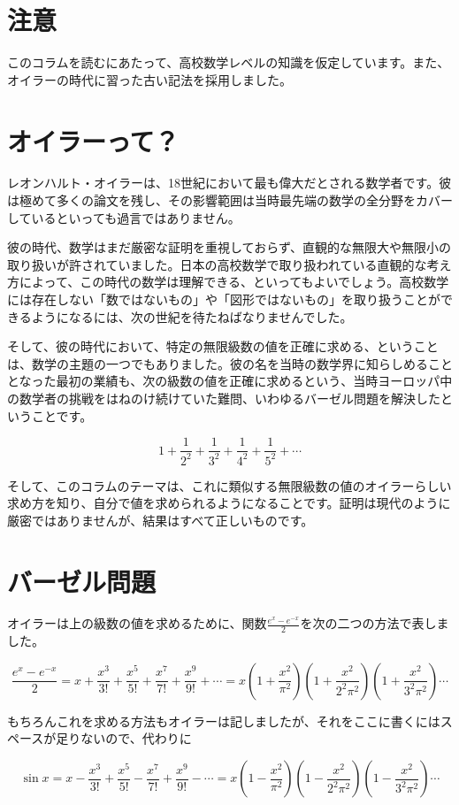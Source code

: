 \documentclass[./main]{subfiles}
\theoremstyle{break}
\begin{document}
\setcounter{section}{-1}
\section{注意}
このコラムを読むにあたって、高校数学レベルの知識を仮定しています。また、オイラーの時代に習った古い記法を採用しました。
\section{オイラーって？}
レオンハルト・オイラーは、18世紀において最も偉大だとされる数学者です。彼は極めて多くの論文を残し、その影響範囲は当時最先端の数学の全分野をカバーしているといっても過言ではありません。

彼の時代、数学はまだ厳密な証明を重視しておらず、直観的な無限大や無限小の取り扱いが許されていました。日本の高校数学で取り扱われている直観的な考え方によって、この時代の数学は理解できる、といってもよいでしょう。高校数学には存在しない「数ではないもの」や「図形ではないもの」を取り扱うことができるようになるには、次の世紀を待たねばなりませんでした。

そして、彼の時代において、特定の無限級数の値を正確に求める、ということは、数学の主題の一つでもありました。彼の名を当時の数学界に知らしめることとなった最初の業績も、次の級数の値を正確に求めるという、当時ヨーロッパ中の数学者の挑戦をはねのけ続けていた難問、いわゆるバーゼル問題を解決したということです。

\[1+\frac{1}{2^2}+\frac{1}{3^2}+\frac{1}{4^2}+\frac{1}{5^2}+\cdots\]

そして、このコラムのテーマは、これに類似する無限級数の値のオイラーらしい求め方を知り、自分で値を求められるようになることです。証明は現代のように厳密ではありませんが、結果はすべて正しいものです。
\section{バーゼル問題}
オイラーは上の級数の値を求めるために、関数$\displaystyle\frac{e^x-e^{-x}}{2}$を次の二つの方法で表しました。

\[\frac{e^x-e^{-x}}{2}=x+\frac{x^3}{3!}+\frac{x^5}{5!}+\frac{x^7}{7!}+\frac{x^9}{9!}+\cdots=x\left(  1+\frac{x^2}{\pi^2}\right)\left(  1+\frac{x^2}{2^2\pi^2}\right)\left(  1+\frac{x^2}{3^2\pi^2}\right)\cdots\]

もちろんこれを求める方法もオイラーは記しましたが、それをここに書くにはスペースが足りないので、代わりに

\[\sin x=x-\frac{x^3}{3!}+\frac{x^5}{5!}-\frac{x^7}{7!}+\frac{x^9}{9!}-\cdots=x\left(  1-\frac{x^2}{\pi^2}\right)\left(  1-\frac{x^2}{2^2\pi^2}\right)\left(  1-\frac{x^2}{3^2\pi^2}\right)\cdots\]
\end{document}
